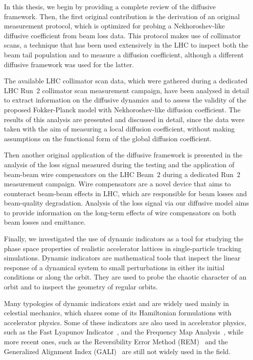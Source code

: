 In this thesis, we begin by providing a complete review of the diffusive framework. Then, the first original contribution is the derivation of an original measurement protocol, which is optimized for probing a Nekhoroshev-like diffusive coefficient from beam loss data. This protocol makes use of collimator scans, a technique that has been used extensively in the LHC to inspect both the beam tail population and to measure a diffusion coefficient, although a different diffusive framework was used for the latter.

The available LHC collimator scan data, which were gathered during a dedicated LHC Run~2 collimator scan measurement campaign, have been analysed in detail to extract information on the diffusive dynamics and to assess the validity of the proposed Fokker-Planck model with Nekhoroshev-like diffusion coefficient. The results of this analysis are presented and discussed in detail, since the data were taken with the aim of measuring a local diffusion coefficient, without making assumptions on the functional form of the global diffusion coefficient.

Then another original application of the diffusive framework is presented in the analysis of the loss signal measured during the testing and the application of beam-beam wire compensators on the LHC Beam~2 during a dedicated Run~2 measurement campaign. Wire compensators are a novel device that aims to counteract beam-beam effects in LHC, which are responsible for beam losses and beam-quality degradation. Analysis of the loss signal via our diffusive model aims to provide information on the long-term effects of wire compensators on both beam losses and emittance. 

Finally, we investigated the use of dynamic indicators as a tool for studying the phase space properties of realistic accelerator lattices in single-particle tracking simulations. Dynamic indicators are mathematical tools that inspect the linear response of a dynamical system to small perturbations in either its initial conditions or along the orbit. They are used to probe the chaotic character of an orbit and to inspect the geometry of regular orbits. 

Many typologies of dynamic indicators exist and are widely used mainly in celestial mechanics, which shares some of its Hamiltonian formulations with accelerator physics. Some of these indicators are also used in accelerator physics, such as the Fast Lyapunov Indicator~\cite{Froeschle1997, SZEZECH2005394}, and the Frequency Map Analysis~\cite{Laskar1999,Laskar2003}, while more recent ones, such as the Reversibility Error Method (REM)~\cite{Panichi2016,Panichi2017} and the Generalized Alignment Index (GALI)~\cite{Bountis2007,Skokos2015} are still not widely used in the field.

